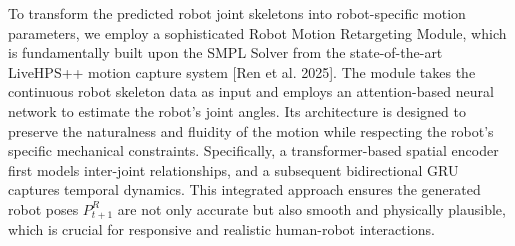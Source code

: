 
To transform the predicted robot joint skeletons into robot-specific motion parameters, we employ a sophisticated Robot Motion Retargeting Module, which is fundamentally built upon the SMPL Solver from the state-of-the-art LiveHPS++ motion capture system [Ren et al. 2025]. The module takes the continuous robot skeleton data as input and employs an attention-based neural network to estimate the robot's joint angles. Its architecture is designed to preserve the naturalness and fluidity of the motion while respecting the robot's specific mechanical constraints. Specifically, a transformer-based spatial encoder first models inter-joint relationships, and a subsequent bidirectional GRU captures temporal dynamics. This integrated approach ensures the generated robot poses \(P^{R}_{t+1}\) are not only accurate but also smooth and physically plausible, which is crucial for responsive and realistic human-robot interactions.



